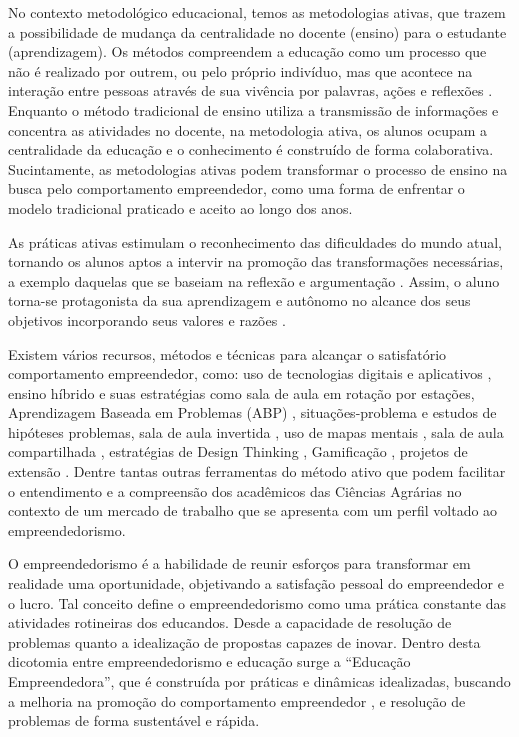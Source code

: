 No contexto metodológico educacional, temos as metodologias ativas, que trazem a possibilidade de mudança da centralidade no docente (ensino) para o estudante (aprendizagem). Os métodos compreendem a educação como um processo que não é realizado por outrem, ou pelo próprio indivíduo, mas que acontece na interação entre pessoas através de sua vivência por palavras, ações e reflexões \cite{paiva_metodologias_2016}. Enquanto o método tradicional de ensino utiliza a transmissão de informações e concentra as atividades no docente, na metodologia ativa, os alunos ocupam a centralidade da educação e o conhecimento é construído de forma colaborativa. Sucintamente, as metodologias ativas podem transformar o processo de ensino na busca pelo comportamento empreendedor, como uma forma de enfrentar o modelo tradicional praticado e aceito ao longo dos anos.
 
As práticas ativas estimulam o reconhecimento das dificuldades do mundo atual, tornando os alunos aptos a intervir na promoção das transformações necessárias, a exemplo daquelas que se baseiam na reflexão e argumentação \cite{bezanilla_methodologies_2019}. Assim, o aluno torna-se protagonista da sua aprendizagem e autônomo no alcance dos seus objetivos incorporando seus valores e razões \cite{rubel_student_2016}.

Existem vários recursos, métodos e técnicas para alcançar o satisfatório comportamento empreendedor, como: uso de tecnologias digitais e aplicativos \cite{pereira_use_2020}, ensino híbrido e suas estratégias como sala de aula em rotação por estações, Aprendizagem Baseada em Problemas (ABP) \cite{souza_aprendizagem_2015}, situações-problema e estudos de hipóteses problemas, sala de aula invertida \cite{junior_sala_2016,branco_sala_2016}, uso de mapas mentais \cite{junior_percepcao_2018}, sala de aula compartilhada \cite{strack_por_2009}, estratégias de Design Thinking \cite{andrews_circular_2015}, Gamificação \cite{ogawa_avaliacao_2016}, projetos de extensão \cite{santos_projeto_2019}. Dentre tantas outras ferramentas do método ativo que podem facilitar o entendimento e a compreensão dos acadêmicos das Ciências Agrárias no contexto de um mercado de trabalho que se apresenta com um perfil voltado ao empreendedorismo.

O empreendedorismo é a habilidade de reunir esforços para transformar em realidade uma oportunidade, objetivando a satisfação pessoal do empreendedor e o lucro. Tal conceito define o empreendedorismo como uma prática constante das atividades rotineiras dos educandos. Desde a capacidade de resolução de problemas quanto a idealização de propostas capazes de inovar. Dentro desta dicotomia entre empreendedorismo e educação surge a “Educação Empreendedora”, que é construída por práticas e dinâmicas idealizadas, buscando a melhoria na promoção do comportamento empreendedor \cite{martins_educacao_2016, morais_empreendedorismo_2018}, e resolução de problemas de forma sustentável e rápida.

